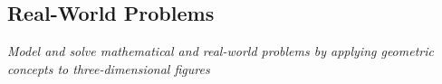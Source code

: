 \subsection[real-world]{Real-World Problems}



\textit{Model and solve mathematical and real-world problems by applying geometric concepts to
three-dimensional figures}